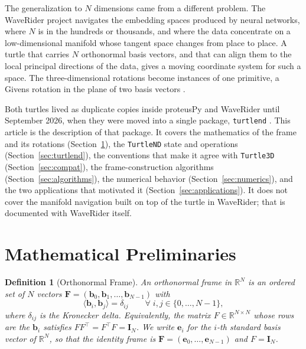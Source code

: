 \documentclass[11pt,letterpaper]{article}
\newtheorem{definition}{Definition}[section]
\newcommand{\R}{\mathbb{R}}
\newcommand{\frm}{\mathbf{F}}
\newcommand{\basis}{\mathbf{b}}
\newcommand{\std}{\mathbf{e}}
\newcommand{\eye}{\mathbf{I}}
\newcommand{\code}[1]{\texttt{#1}}
\begin{document}
The generalization to $N$ dimensions came from a different problem.
The WaveRider project \citep{suchanek2026waverider} navigates the
embedding spaces produced by neural networks, where $N$ is in the
hundreds or thousands, and where the data concentrate on a
low-dimensional manifold whose tangent space changes from place to
place. A turtle that carries $N$ orthonormal basis vectors, and that
can align them to the local principal directions of the data, gives a
moving coordinate system for such a space. The three-dimensional
rotations become instances of one primitive, a Givens rotation in the
plane of two basis vectors \citep{givens1958computation}.

Both turtles lived as duplicate copies inside proteusPy and WaveRider
until September 2026, when they were moved into a single package,
\code{turtlend} \citep{suchanek2026turtlendsoftware}. This article is
the description of that package. It covers the mathematics of the
frame and its rotations (Section~\ref{sec:prelim}), the
\code{TurtleND} state and operations (Section~\ref{sec:turtlend}), the
conventions that make it agree with \code{Turtle3D}
(Section~\ref{sec:compat}), the frame-construction algorithms
(Section~\ref{sec:algorithms}), the numerical behavior
(Section~\ref{sec:numerics}), and the two applications that motivated
it (Section~\ref{sec:applications}). It does not cover the manifold
navigation built on top of the turtle in WaveRider; that is documented
with WaveRider itself.

\section{Mathematical Preliminaries}
\label{sec:prelim}

\begin{definition}[Orthonormal Frame]
\label{def:frame}
An \emph{orthonormal frame} in $\R^N$ is an ordered set of $N$ vectors
$\frm = (\basis_0, \basis_1, \ldots, \basis_{N-1})$ with
\begin{equation}
  \langle \basis_i, \basis_j \rangle = \delta_{ij}
  \qquad \forall\; i, j \in \{0, \ldots, N-1\},
\end{equation}
where $\delta_{ij}$ is the Kronecker delta. Equivalently, the matrix
$F \in \R^{N \times N}$ whose rows are the $\basis_i$ satisfies
$F F^\top = F^\top F = \eye_N$. We write $\std_i$ for the $i$-th
standard basis vector of $\R^N$, so that the identity frame is
$\frm = (\std_0, \ldots, \std_{N-1})$ and $F = \eye_N$.
\end{definition}
\end{document}
